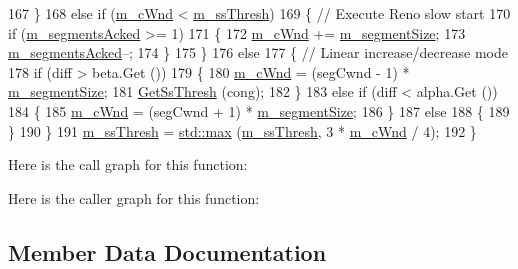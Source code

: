 \begin{DoxyCode}
167     \}
168   \textcolor{keywordflow}{else} \textcolor{keywordflow}{if} (\hyperlink{classTcpVegasTest_a60f99e3ccb08c3ebfd7e7de6896ec2be}{m\_cWnd} < \hyperlink{classTcpVegasTest_afee1db7a63768ef7cbf6641f2235c263}{m\_ssThresh})
169     \{ \textcolor{comment}{// Execute Reno slow start}
170       \textcolor{keywordflow}{if} (\hyperlink{classTcpVegasTest_af429efbb9af0e86883c30c8177e1ee0e}{m\_segmentsAcked} >= 1)
171         \{
172           \hyperlink{classTcpVegasTest_a60f99e3ccb08c3ebfd7e7de6896ec2be}{m\_cWnd} += \hyperlink{classTcpVegasTest_a93c5780c0af6cdfa7af29c0a5688ca0a}{m\_segmentSize};
173           \hyperlink{classTcpVegasTest_af429efbb9af0e86883c30c8177e1ee0e}{m\_segmentsAcked}--;
174         \}
175     \}
176   \textcolor{keywordflow}{else}
177     \{ \textcolor{comment}{// Linear increase/decrease mode}
178       \textcolor{keywordflow}{if} (diff > beta.Get ())
179         \{
180           \hyperlink{classTcpVegasTest_a60f99e3ccb08c3ebfd7e7de6896ec2be}{m\_cWnd} = (segCwnd - 1) * \hyperlink{classTcpVegasTest_a93c5780c0af6cdfa7af29c0a5688ca0a}{m\_segmentSize};
181           \hyperlink{classTcpVegasTest_a569cf1bac86619b1d7f458b790a48d93}{GetSsThresh} (cong);
182         \}
183       \textcolor{keywordflow}{else} \textcolor{keywordflow}{if} (diff < alpha.Get ())
184         \{
185           \hyperlink{classTcpVegasTest_a60f99e3ccb08c3ebfd7e7de6896ec2be}{m\_cWnd} = (segCwnd + 1) * \hyperlink{classTcpVegasTest_a93c5780c0af6cdfa7af29c0a5688ca0a}{m\_segmentSize};
186         \}
187       \textcolor{keywordflow}{else}
188         \{
189         \}
190     \}
191   \hyperlink{classTcpVegasTest_afee1db7a63768ef7cbf6641f2235c263}{m\_ssThresh} = \hyperlink{80211b_8c_affe776513b24d84b39af8ab0930fef7f}{std::max} (\hyperlink{classTcpVegasTest_afee1db7a63768ef7cbf6641f2235c263}{m\_ssThresh}, 3 * \hyperlink{classTcpVegasTest_a60f99e3ccb08c3ebfd7e7de6896ec2be}{m\_cWnd} / 4);
192 \}
\end{DoxyCode}


Here is the call graph for this function\+:




Here is the caller graph for this function\+:




\subsection{Member Data Documentation}
